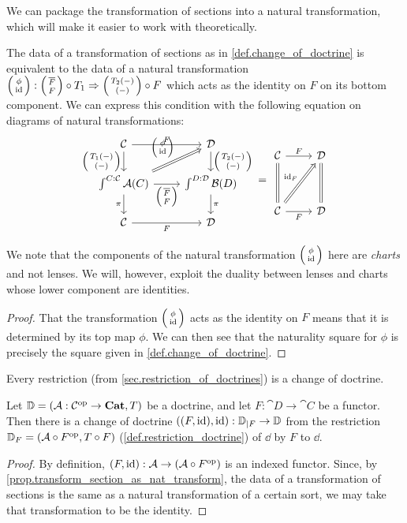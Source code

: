 \documentclass[DynamicalBook]{subfiles}
\begin{document}
We can package the transformation of sections into a natural transformation,
which will make it easier to work with theoretically.
\begin{proposition}\label{prop.transform_section_as_nat_transform}
The data of a transformation of sections as in \cref{def.change_of_doctrine} is equivalent to the data
of a natural transformation $\lens{\phi}{\id} : \lens{\overline{F}}{F} \circ T_1
    \Rightarrow \lens{T_2(-)}{(-)} \circ F$ which acts as the identity on $F$ on
    its bottom component. We can express this condition with the following equation on
    diagrams of natural transformations: 
    \[
\begin{tikzcd}
  \cat{C} \ar[d,"{\lens{T_1(-)}{(-)}}"'] \ar[r, "F"] & \cat{D} \ar[d,
  "{\lens{T_2(-)}{(-)}}"] \\
\int^{C : \cat{C}}\cat{A}(C) \ar[r, "\lens{\overline{F}}{F}"'] \ar[ur,
Rightarrow, "{\lens{\phi}{\id}}"] \ar[d,"\pi"'] & \int^{D :
  \cat{D}} \cat{B}(D) \ar[d, "\pi"]\\
\cat{C} \ar[r, "F"'] & \cat{D}
\end{tikzcd} 
=
\begin{tikzcd}
  \cat{C} \ar[dd, equals] \ar[r, "F"] & \cat{D} \ar[dd, equals] \\
  & \\
\cat{C} \ar[r, "F"'] \ar[uur, Rightarrow, "\id_F"] & \cat{D}
\end{tikzcd}
\]
\end{proposition}
\begin{remark}
  We note that the components of the natural transformation $\lens{\phi}{\id}$
  here are \emph{charts} and not lenses. We will, however, exploit the duality
  between lenses and charts whose lower component are identities.
\end{remark}
\begin{proof}
  That the transformation $\lens{\phi}{\id}$ acts as the identity on $F$ means
  that it is determined by its top map $\phi$. We can then see that the
  naturality square for $\phi$ is precisely the square given in \cref{def.change_of_doctrine}.
\end{proof}


Every restriction (from \cref{sec.restriction_of_doctrines}) is a change of doctrine.
\begin{proposition}
Let $\mathbb{D} = (\mathcal{A} : \mathcal{C}^{\textnormal{op}} \to \textbf{Cat}, T)$ be a doctrine, and let $F :
\cat{D} \to \cat{C}$ be a functor. Then there is a change of doctrine $((F,
\mathrm{id}), \mathrm{id}) : \mathbb{D}_{|F} \to \mathbb{D}$ from the restriction $\mathbb{D}_F = (\mathcal{A} \circ
F^{\textnormal{op}}, T \circ F)$ (\cref{def.restriction_doctrine}) of $\dd$ by $F$ to $\dd$.
\end{proposition}
\begin{proof}
By definition, $(F, \mathrm{id}) : \mathcal{A} \to (\mathcal{A} \circ F^{\textnormal{op}})$ is an indexed
functor. Since, by \cref{prop.transform_section_as_nat_transform}, the data of a
transformation of sections is the same as a natural transformation of a certain
sort, we may take that transformation to be the identity.
\end{proof}
\end{document}
